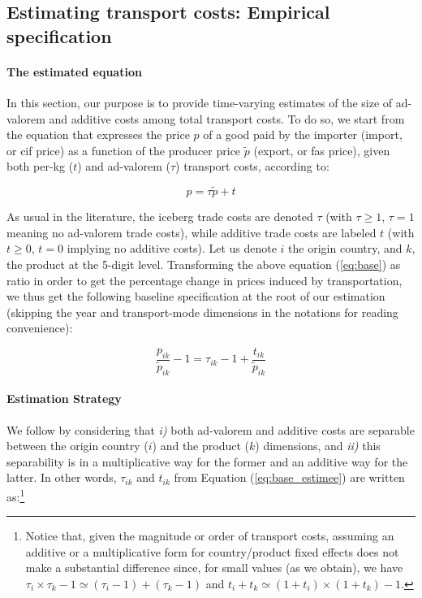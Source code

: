 \documentclass[a4paper,11pt]{article}
\begin{document}
\subsection{Estimating transport costs: Empirical specification}

\paragraph{The estimated equation} In this section, our purpose is to provide time-varying estimates of the size of ad-valorem and additive costs among total transport costs. To do so, we start from the equation that expresses the price $p$ of a good paid by the importer (import, or cif price) as a function of the producer price $\widetilde{p}$ (export, or fas price), given both per-kg ($t$) and ad-valorem ($\tau$) transport costs, according to:

\begin{equation}
p = \tau \widetilde{p}+ t \label{eq:base}
\end{equation}

\noindent As usual in the literature, the iceberg trade costs are denoted $\tau$ (with  $\tau \geq 1$, $\tau=1$ meaning no ad-valorem trade costs), while additive trade costs are labeled $t$ (with $t \geq 0$, $t=0$ implying no additive costs).  Let us denote $i$ the origin country, and $k$, the product at the 5-digit level. Transforming the above equation (\ref{eq:base}) as ratio in order to get the percentage change in prices induced by transportation, we thus get the following baseline specification at the root of our estimation (skipping the year and transport-mode dimensions in the notations for reading convenience):

\begin{equation}
\frac{p_{ik}}{\widetilde{p}_{ik}} -1 = \tau_{ik} -1 +\frac{t_{ik}}{ \widetilde{p}_{ik}} \label{eq:base_estimee}
\end{equation}

\paragraph{Estimation Strategy} We follow \citet{Irrazabal_2015} by considering that \textit{i)} both ad-valorem and additive costs are separable between the origin country ($i$) and the product ($k$) dimensions, and \textit{ii)} this separability is in a multiplicative way for the former and an additive way for the latter. In other words, $\tau_{ik}$ and $t_{ik}$ from Equation (\ref{eq:base_estimee}) are written as:\footnote{Notice that, given the magnitude or order of transport costs, assuming an additive or a multiplicative form for country/product fixed effects does not make a substantial difference since, for small values (as we obtain), we have $\tau_i\times \tau_k -1 \simeq (\tau_i-1) + (\tau_k -1)$ and $t_i+t_k\simeq (1+t_i)\times(1+t_k)-1$.}
\end{document}
